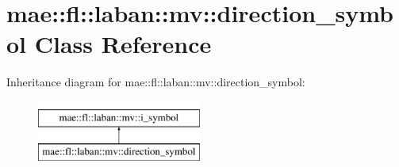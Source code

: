 \hypertarget{classmae_1_1fl_1_1laban_1_1mv_1_1direction__symbol}{\section{mae\-:\-:fl\-:\-:laban\-:\-:mv\-:\-:direction\-\_\-symbol Class Reference}
\label{classmae_1_1fl_1_1laban_1_1mv_1_1direction__symbol}
}
Inheritance diagram for mae\-:\-:fl\-:\-:laban\-:\-:mv\-:\-:direction\-\_\-symbol\-:\begin{figure}[H]
\begin{center}
\leavevmode
\includegraphics[height=2.000000cm]{classmae_1_1fl_1_1laban_1_1mv_1_1direction__symbol}
\end{center}
\end{figure}
